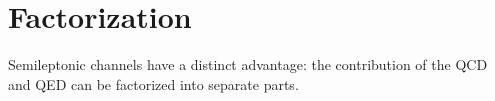 \section{Factorization}
Semileptonic channels have a distinct advantage: the contribution of the QCD and
QED can be factorized into separate parts.

